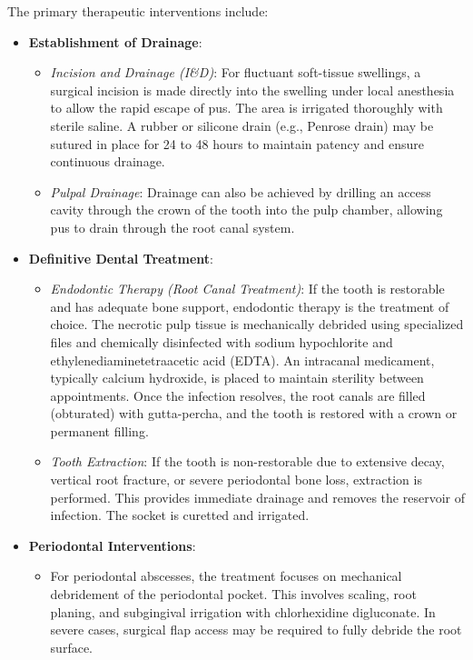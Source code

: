 The primary therapeutic interventions include:
\begin{itemize}
  \item \textbf{Establishment of Drainage}:
    \begin{itemize}
      \item \textit{Incision and Drainage (I\&D)}: For fluctuant soft-tissue swellings, a surgical incision is made directly into the swelling under local anesthesia to allow the rapid escape of pus. The area is irrigated thoroughly with sterile saline. A rubber or silicone drain (e.g., Penrose drain) may be sutured in place for 24 to 48 hours to maintain patency and ensure continuous drainage.
      \item \textit{Pulpal Drainage}: Drainage can also be achieved by drilling an access cavity through the crown of the tooth into the pulp chamber, allowing pus to drain through the root canal system.
    \end{itemize}
  \item \textbf{Definitive Dental Treatment}:
    \begin{itemize}
      \item \textit{Endodontic Therapy (Root Canal Treatment)}: If the tooth is restorable and has adequate bone support, endodontic therapy is the treatment of choice. The necrotic pulp tissue is mechanically debrided using specialized files and chemically disinfected with sodium hypochlorite and ethylenediaminetetraacetic acid (EDTA). An intracanal medicament, typically calcium hydroxide, is placed to maintain sterility between appointments. Once the infection resolves, the root canals are filled (obturated) with gutta-percha, and the tooth is restored with a crown or permanent filling.
      \item \textit{Tooth Extraction}: If the tooth is non-restorable due to extensive decay, vertical root fracture, or severe periodontal bone loss, extraction is performed. This provides immediate drainage and removes the reservoir of infection. The socket is curetted and irrigated.
    \end{itemize}
  \item \textbf{Periodontal Interventions}:
    \begin{itemize}
      \item For periodontal abscesses, the treatment focuses on mechanical debridement of the periodontal pocket. This involves scaling, root planing, and subgingival irrigation with chlorhexidine digluconate. In severe cases, surgical flap access may be required to fully debride the root surface.

\end{itemize}
\end{itemize}
